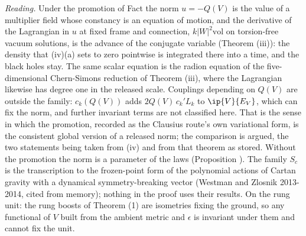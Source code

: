 \emph{Reading.} Under the promotion of Fact  the norm $u = -Q(V)$ is the value of a multiplier field whose constancy is an equation of motion, and the derivative of the Lagrangian in $u$ at fixed frame and connection, $k|W|^{2}\mathrm{vol}$ on torsion-free vacuum solutions, is the advance of the conjugate variable (Theorem (iii)): the density that (iv)(a) sets to zero pointwise is integrated there into a time, and the black holes stay. The same scalar equation is the radion equation of the five-dimensional Chern-Simons reduction of Theorem (iii), where the Lagrangian likewise has degree one in the released scale. Couplings depending on $Q(V)$ are outside the family: $c_{k}(Q(V))$ adds $2Q(V)\,c_{k}'L_{k}$ to $\ip{V}{E_{V}}$, which can fix the norm, and further invariant terms are not classified here. That is the sense in which the promotion, recorded as the Clausius route's own variational form, is the consistent global version of a released norm; the comparison is argued, the two statements being taken from (iv) and from that theorem as stored. Without the promotion the norm is a parameter of the laws (Proposition ). The family $S_{c}$ is the transcription to the frozen-point form of the polynomial actions of Cartan gravity with a dynamical symmetry-breaking vector (Westman and Zlosnik 2013-2014, cited from memory); nothing in the proof uses their results. On the rung unit: the rung boosts of Theorem (1) are isometries fixing the ground, so any functional of $V$ built from the ambient metric and $\epsilon$ is invariant under them and cannot fix the unit.
